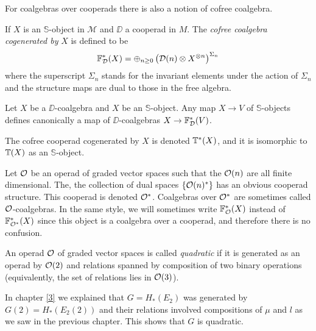 \documentclass[TFM.tex]{subfiles}
\begin{document}
For coalgebras over cooperads there is also a notion of cofree coalgebra. 

\begin{defi}
If $X$ is an $\mathbb{S}$-object in $\mathscr{M}$ and $\DD$ a cooperad in $M$. The \emph{cofree coalgebra cogenerated by }$X$ is defined to be
\[
\mathbb{F}^*_{\mathcal{D}}(X)=\oplus_{n\geq 0}\left(\mathcal{D}(n)\otimes X^{\otimes n}\right)^{\Sigma_n}
\]
where the superscript $\Sigma_n$ stands for the invariant elements under the action of $\Sigma_n$ and the structure maps are dual to those in the free algebra. %
\end{defi}



Let $X$ be a $\DD$-coalgebra and $X$ be an $\mathbb{S}$-object. Any map $X\to V$ of $\mathbb{S}$-objects defines canonically a map of $\DD$-coalgebras $X\to \mathbb{F}_{\mathcal{D}}^*(V)$.  

The cofree cooperad cogenerated by $X$ is denoted $\mathbb{T}^*(X)$, and it is isomorphic to $\mathbb{T}(X)$ as an $\mathbb{S}$-object. 

\begin{remark}\label{dual}
Let ${\mathcal O}$ be an operad of graded vector spaces such that the ${\mathcal O}(n)$ are all finite dimensional. The, the collection of dual spaces $\{{\mathcal O}(n)^*\}$ has an obvious cooperad structure. This cooperad is denoted ${\mathcal O}^*$. Coalgebras over ${\mathcal O}^*$ are sometimes called ${\mathcal O}$-coalgebras. In the same style, we will sometimes write $\mathbb{F}^*_{\mathcal O}(X)$ instead of $\mathbb{F}^*_{{\mathcal O}^*}(X)$ since this object is a coalgebra over a cooperad, and therefore there is no confusion.
\end{remark}

\begin{defi}
An operad ${\mathcal O}$ of graded vector spaces is called \emph{quadratic} if it is generated as an operad by ${\mathcal O}(2)$ and relations spanned by composition of two binary operations (equivalently, the set of relations lies in ${\mathcal O}(3)$). 
\end{defi}

In chapter \ref{3} we explained that $G=H_*(E_2)$ was generated by $G(2)=H_*(E_2(2))$ and their relations involved compositions of $\mu$ and $l$ as we saw in the previous chapter. This shows that $G$ is quadratic. %
\end{document}
